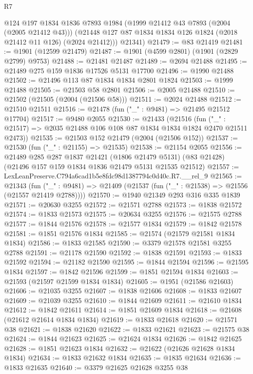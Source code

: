 \begin{lexlean}{R7}
\begin{coremodule}
        @124
        @197
        @1834
        @1836
        @7893
        @1984
        (@1999 @21412 @43 @7893 (@2004 (@2005 @21412 @43)))
        (@21448 @127 @87 @1834 @1834 @126 @1824 (@2018 @21412 @11 @126) (@2024 @21412)))
      @21341)
@21479 := @83 @21419
@21481 := @1901 (@12599 @21479)
@21487 := @1901 (@4599 @2801) (@1901 (@2829 @2799) @9753)
@21488 := @21481 @21487
@21489 := @2694 @21488
@21495 := @21489 @275 @159 @1836 @17526 @5131 @17700
@21496 := @1990 @21488
@21502 := @21496 @113 @87 @1834 @1834 @2801 @1824
@21503 := @1999 @21488
@21505 := @21503 @58 @2801
@21506 := @2005 @21488
@21510 := @21502 (@21505 (@2004 (@21506 @58)))
@21511 := @2024 @21488
@21512 := @21510 @21511
@21516 := @21478 (fun ("_" : @9481) => @21495 @21512 @17704)
@21517 := @9480 @2055
@21530 := @21433
    (@21516 (fun ("_" : @21517) => @2035 @21488 @106 @108 @87 @1834 @1834 @1824 @2470 @21511 @2473))
@21535 := @21503 @152 @21479 (@2004 (@21506 @152))
@21537 := @21530 (fun ("_" : @21155) => @21535)
@21538 := @21154 @2055
@21556 := @21489
    @285
    @287
    @1837
    @21421
    (@1806 @21479 @5131)
    (@83 @21428)
    (@21496 @157 @159 @1834 @1836 @21479 @5131 @21535 @21512)
@21557 := LexLeanPreserve.C794a6cad1b5e8fdc98d1387794c0d40c.R7.__rel_9
@21565 := @21343
    (fun ("_" : @9481) => @21409 (@21537 (fun ("_" : @21538) => @21556 (@21557 @21419 @2788))))
@21570 := @1940 @21349 @293 @316 @335 @1839
@21571 := @20630 @3255
@21572 := @21571 @2788
@21573 := @1838 @21572
@21574 := @1833 @21573
@21575 := @20634 @3255
@21576 := @21575 @2788
@21577 := @1844 @21576
@21578 := @21577 @1834
@21579 := @1842 @21578
@21581 := @1851 @21576 @1834
@21585 := @21574 (@21579 @21581 @1834 @1834)
@21586 := @1833 @21585
@21590 := @3379 @21578 @21581 @3255 @2788
@21591 := @21178 @21590
@21592 := @1838 @21591
@21593 := @1833 @21592
@21594 := @21182 @21590
@21595 := @1844 @21594
@21596 := @21595 @1834
@21597 := @1842 @21596
@21599 := @1851 @21594 @1834
@21603 := @21593 (@21597 @21599 @1834 @1834)
@21605 := @1951 (@21586 @21603)
@21606 := @21035 @3255
@21607 := @1838 @21606
@21608 := @1833 @21607
@21609 := @21039 @3255
@21610 := @1844 @21609
@21611 := @21610 @1834
@21612 := @1842 @21611
@21614 := @1851 @21609 @1834
@21618 := @21608 (@21612 @21614 @1834 @1834)
@21619 := @1833 @21618
@21620 := @21571 @38
@21621 := @1838 @21620
@21622 := @1833 @21621
@21623 := @21575 @38
@21624 := @1844 @21623
@21625 := @21624 @1834
@21626 := @1842 @21625
@21628 := @1851 @21623 @1834
@21632 := @21622 (@21626 @21628 @1834 @1834)
@21634 := @1833 @21632 @1834
@21635 := @1835 @21634
@21636 := @1833 @21635
@21640 := @3379 @21625 @21628 @3255 @38

\end{coremodule}
\end{lexlean}
